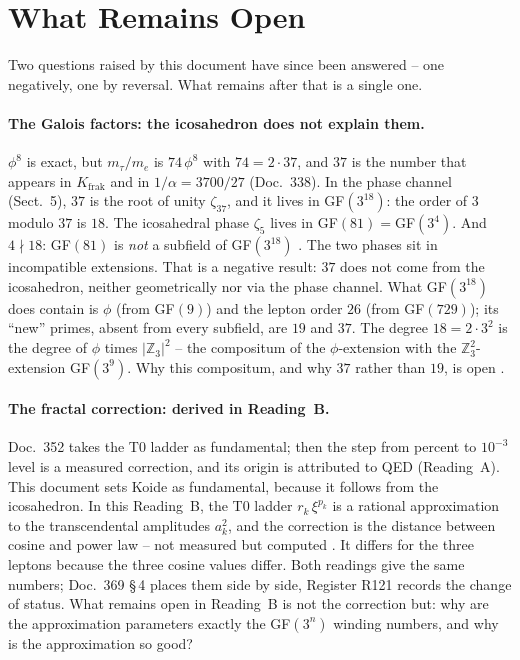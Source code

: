 \section{What Remains Open}

Two questions raised by this document have since been answered -- one
negatively, one by reversal. What remains after that is a single one.

\paragraph{The Galois factors: the icosahedron does not explain them.}
$\phi^8$ is exact, but $m_\tau/m_e$ is $74\,\phi^8$ with $74 = 2\cdot37$, and
$37$ is the number that appears in $K_\text{frak}$ and in $1/\alpha = 3700/27$
(Doc.~338). In the phase channel (Sect.~5), $37$ is the root of unity
$\zeta_{37}$, and it lives in GF$(3^{18})$: the order of $3$ modulo $37$ is $18$.
The icosahedral phase $\zeta_5$ lives in GF$(81)=$GF$(3^4)$. And $4\nmid18$:
GF$(81)$ is \emph{not} a subfield of GF$(3^{18})$ \BM. The two phases sit in
incompatible extensions. That is a negative result: $37$ does not come from the
icosahedron, neither geometrically nor via the phase channel. What GF$(3^{18})$
does contain is $\phi$ (from GF$(9)$) and the lepton order $26$ (from
GF$(729)$); its ``new'' primes, absent from every subfield, are $19$ and $37$.
The degree $18 = 2\cdot3^2$ is the degree of $\phi$ times $|\mathbb{Z}_3|^2$ --
the compositum of the $\phi$-extension with the $\mathbb{Z}_3^2$-extension
GF$(3^9)$. Why this compositum, and why $37$ rather than $19$, is open \SM.

\paragraph{The fractal correction: derived in Reading~B.}
Doc.~352 takes the T0 ladder as fundamental; then the step from percent to
$10^{-3}$ level is a measured correction, and its origin is attributed to QED
(Reading~A). This document sets Koide as fundamental, because it follows from
the icosahedron. In this Reading~B, the T0 ladder $r_k\,\xi^{p_k}$ is a rational
approximation to the transcendental amplitudes $a_k^2$, and the correction is the
distance between cosine and power law -- not measured but computed \KM. It
differs for the three leptons because the three cosine values differ. Both
readings give the same numbers; Doc.~369 §\,4 places them side by side, Register
R121 records the change of status. What remains open in Reading~B is not the
correction but: why are the approximation parameters exactly the GF$(3^n)$
winding numbers, and why is the approximation so good?

